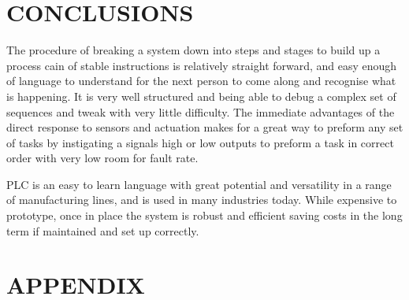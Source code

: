 \documentclass[a4paper, 10pt]{article}
\begin{document}


\section{CONCLUSIONS}
The procedure of breaking a system down into steps and stages to build up a process cain of stable instructions is relatively straight forward, and easy enough of language to understand for the next person to come along and recognise what is happening. It is very well structured and being able to debug a complex set of sequences and tweak with very little difficulty. The immediate advantages of the direct response to sensors and actuation makes for a great way to preform any set of tasks by instigating a signals high or low outputs to preform a task in correct order with very low room for fault rate.

PLC is an easy to learn language with great potential and versatility in a range of manufacturing lines, and is used in many industries today. While expensive to prototype, once in place the system is robust and efficient saving costs in the long term if maintained and set up correctly.



\nocite{*}




\clearpage
\section*{APPENDIX}

\end{document}
